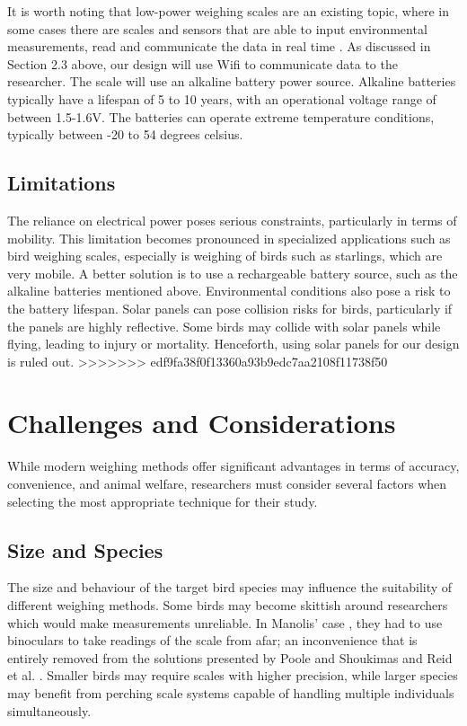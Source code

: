 \documentclass[class=report,11pt,crop=false]{standalone}
\begin{document}
It is worth noting that low-power weighing scales are an existing topic, where in some cases there are scales and sensors that are able to input environmental measurements, read and communicate the data in real time \cite{ImageBased}. As discussed in Section 2.3 above, our design will use Wifi to communicate data to the researcher. The scale will use an alkaline battery power source. Alkaline batteries typically have a lifespan of 5 to 10 years, with an operational voltage range of between 1.5-1.6V. The batteries can operate extreme temperature conditions, typically between -20 to 54 degrees celsius.

\subsection{Limitations}
The reliance on electrical power poses serious constraints, particularly in terms of mobility. This limitation becomes pronounced in specialized applications such as bird weighing scales, especially is weighing of birds such as starlings, which are very mobile. A better solution is to use a rechargeable battery source, such as the alkaline batteries mentioned above. Environmental conditions also pose a risk to the battery lifespan. Solar panels can pose collision risks for birds, particularly if the panels are highly reflective. Some birds may collide with solar panels while flying, leading to injury or mortality. Henceforth, using solar panels for our design is ruled out. 
>>>>>>> edf9fa38f0f13360a93b9edc7aa2108f11738f50

\pagebreak
\section{Challenges and Considerations}
While modern weighing methods offer significant advantages in terms of accuracy, convenience, and animal welfare, researchers must consider several factors when selecting the most appropriate technique for their study.

\subsection{Size and Species}
The size and behaviour of the target bird species may influence the suitability of different weighing methods. Some birds may become skittish around researchers which would make measurements unreliable. In Manolis’ case \cite{manoils2024simple}, they had to use binoculars to take readings of the scale from afar; an inconvenience that is entirely removed from the solutions presented by Poole and Shoukimas \cite{poole1982scale} and Reid et al. \cite{reid1999measurement}. Smaller birds may require scales with higher precision, while larger species may benefit from perching scale systems capable of handling multiple individuals simultaneously.
\end{document}
